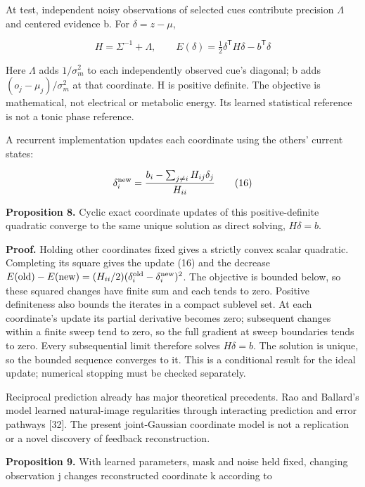 \documentclass[
  american,
  11pt,
  letterpaper,
]{article}
\begin{document}
At test, independent noisy observations of selected cues contribute precision \(\Lambda\) and centered evidence b. For \(\delta=z-\mu\),

\begin{equation}
H=\Sigma^{-1}+\Lambda,\qquad E(\delta)=\tfrac12\delta^{\mathsf T}H\delta-b^{\mathsf T}\delta\tag{15}
\end{equation}

Here \(\Lambda\) adds \(1/\sigma_m^2\) to each independently observed cue's diagonal; b adds \((o_j-\mu_j)/\sigma_m^2\) at that coordinate. H is positive definite. The objective is mathematical, not electrical or metabolic energy. Its learned statistical reference is not a tonic phase reference.

A recurrent implementation updates each coordinate using the others' current states:

\begin{equation}
\delta_i^{\rm new}=\frac{b_i-\sum_{j\ne i}H_{ij}\delta_j}{H_{ii}}\tag{16}
\end{equation}

\textbf{Proposition 8.} Cyclic exact coordinate updates of this positive-definite quadratic converge to the same unique solution as direct solving, \(H\delta=b\).

\textbf{Proof.} Holding other coordinates fixed gives a strictly convex scalar quadratic. Completing its square gives the update (16) and the decrease \(E(\mathrm{old})-E(\mathrm{new})=(H_{ii}/2)(\delta_i^{\rm old}-\delta_i^{\rm new})^2\). The objective is bounded below, so these squared changes have finite sum and each tends to zero. Positive definiteness also bounds the iterates in a compact sublevel set. At each coordinate's update its partial derivative becomes zero; subsequent changes within a finite sweep tend to zero, so the full gradient at sweep boundaries tends to zero. Every subsequential limit therefore solves \(H\delta=b\). The solution is unique, so the bounded sequence converges to it. This is a conditional result for the ideal update; numerical stopping must be checked separately.

Reciprocal prediction already has major theoretical precedents. Rao and Ballard's model learned natural-image regularities through interacting prediction and error pathways {[}32{]}. The present joint-Gaussian coordinate model is not a replication or a novel discovery of feedback reconstruction.

\textbf{Proposition 9.} With learned parameters, mask and noise held fixed, changing observation j changes reconstructed coordinate k according to
\end{document}
